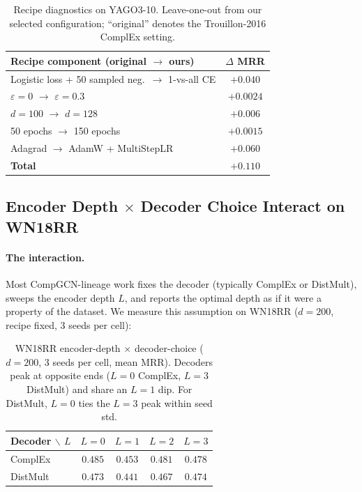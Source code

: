 \documentclass[runningheads]{llncs}
\begin{document}
\begin{table}[!htbp]
\centering
\caption{Recipe diagnostics on YAGO3-10. Leave-one-out from our selected configuration; ``original'' denotes the Trouillon-2016 ComplEx setting.}
\label{tab:decomposition}
\footnotesize
\setlength{\tabcolsep}{3pt}
\begin{tabular}{lc}
\toprule
Recipe component (original $\to$ ours) & $\Delta$ MRR \\
\midrule
Logistic loss + 50 sampled neg.\ $\to$ 1-vs-all CE & $+0.040$ \\
$\varepsilon = 0$ $\to$ $\varepsilon = 0.3$ & $+0.0024$ \\
$d = 100$ $\to$ $d = 128$ & $+0.006$ \\
50 epochs $\to$ 150 epochs & $+0.0015$ \\
Adagrad $\to$ AdamW + MultiStepLR & $+0.060$ \\
\midrule
\textbf{Total} & $+0.110$ \\
\bottomrule
\end{tabular}
\end{table}

\subsection{Encoder Depth $\times$ Decoder Choice Interact on WN18RR}
\label{sec:depth-decoder-interaction}

\paragraph{The interaction.}
Most CompGCN-lineage work fixes the decoder (typically ComplEx or DistMult), sweeps the encoder depth $L$, and reports the optimal depth as if it were a property of the dataset. We measure this assumption on WN18RR ($d{=}200$, recipe fixed, 3 seeds per cell):

\begin{table}[!htb]
\centering
\caption{WN18RR encoder-depth $\times$ decoder-choice ($d{=}200$, 3 seeds per cell, mean MRR). Decoders peak at opposite ends ($L{=}0$ ComplEx, $L{=}3$ DistMult) and share an $L{=}1$ dip. For DistMult, $L{=}0$ ties the $L{=}3$ peak within seed std.}
\label{tab:depth-decoder}
\small
\setlength{\tabcolsep}{4pt}
\begin{tabular}{lcccc}
\toprule
Decoder $\backslash$ $L$ & $L{=}0$ & $L{=}1$ & $L{=}2$ & $L{=}3$ \\
\midrule
ComplEx  & $\mathbf{0.485}$ & $0.453$ & $0.481$ & $0.478$ \\
DistMult & $0.473$ & $0.441$ & $0.467$ & $\mathbf{0.474}$ \\
\bottomrule
\end{tabular}
\end{table}
\end{document}
